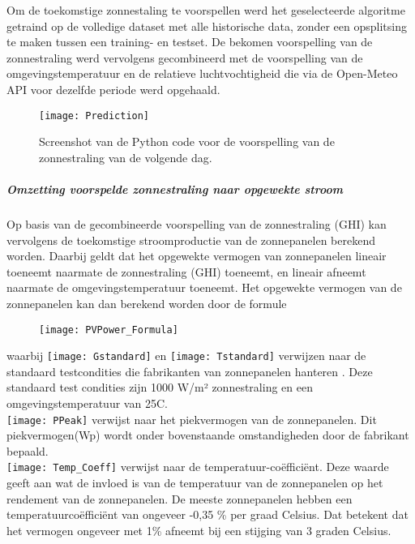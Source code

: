 Om de toekomstige zonnestaling te voorspellen werd het geselecteerde algoritme getraind op de volledige dataset met alle historische data, zonder een opsplitsing te maken tussen een training- en testset. De bekomen voorspelling van de zonnestraling werd vervolgens gecombineerd met de voorspelling van de omgevingstemperatuur en de relatieve luchtvochtigheid die via de Open-Meteo API voor dezelfde periode werd opgehaald. 

\begin{figure}[h!]
    \centering\texttt{[image: Prediction]}
    \caption{\label{fig:Prediction}Screenshot van de Python code voor de voorspelling van de zonnestraling van de volgende dag.}
\end{figure} 

\subparagraph{Omzetting voorspelde zonnestraling naar opgewekte stroom}

Op basis van de gecombineerde voorspelling van de zonnestraling (GHI) kan vervolgens de toekomstige stroomproductie van de zonnepanelen berekend worden. Daarbij geldt dat het opgewekte vermogen van zonnepanelen lineair toeneemt naarmate de zonnestraling (GHI) toeneemt, en lineair afneemt naarmate de omgevingstemperatuur toeneemt. Het opgewekte vermogen van de zonnepanelen kan dan berekend worden door de formule

\begin{figure}[h!]
    \centering\texttt{[image: PVPower\_Formula]}
\end{figure} 

waarbij \texttt{[image: Gstandard]} en \texttt{[image: Tstandard]} verwijzen naar de standaard testcondities die fabrikanten van zonnepanelen hanteren \autocite{Kazem2017}. Deze standaard test condities zijn 1000 W/m² zonnestraling en een omgevingstemperatuur van 25\textdegree C. \\ 

\texttt{[image: PPeak]} verwijst naar het piekvermogen van de zonnepanelen. Dit piekvermogen(Wp) wordt onder bovenstaande omstandigheden door de fabrikant bepaald. \\

\texttt{[image: Temp\_Coeff]} verwijst naar de temperatuur-coëfficiënt. Deze waarde geeft aan wat de invloed is van de temperatuur van de zonnepanelen op het rendement van de zonnepanelen. De meeste zonnepanelen hebben een temperatuurcoëfficiënt van ongeveer -0,35 \% per graad Celsius. Dat betekent dat het vermogen ongeveer met 1\% afneemt bij een stijging van 3 graden Celsius. \\

